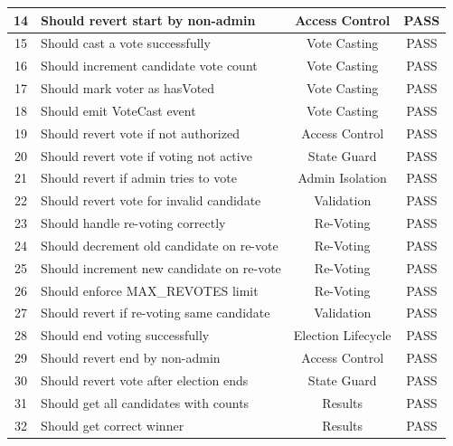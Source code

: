 \documentclass[oneside,a4paper,12pt]{book}
\begin{document}
\begin{longtable}{|c|p{8.5cm}|c|c|}
\hline
14 & Should revert start by non-admin & Access Control & \textcolor{green!60!black}{PASS} \\
\hline
15 & Should cast a vote successfully & Vote Casting & \textcolor{green!60!black}{PASS} \\
\hline
16 & Should increment candidate vote count & Vote Casting & \textcolor{green!60!black}{PASS} \\
\hline
17 & Should mark voter as hasVoted & Vote Casting & \textcolor{green!60!black}{PASS} \\
\hline
18 & Should emit VoteCast event & Vote Casting & \textcolor{green!60!black}{PASS} \\
\hline
19 & Should revert vote if not authorized & Access Control & \textcolor{green!60!black}{PASS} \\
\hline
20 & Should revert vote if voting not active & State Guard & \textcolor{green!60!black}{PASS} \\
\hline
21 & Should revert if admin tries to vote & Admin Isolation & \textcolor{green!60!black}{PASS} \\
\hline
22 & Should revert vote for invalid candidate & Validation & \textcolor{green!60!black}{PASS} \\
\hline
23 & Should handle re-voting correctly & Re-Voting & \textcolor{green!60!black}{PASS} \\
\hline
24 & Should decrement old candidate on re-vote & Re-Voting & \textcolor{green!60!black}{PASS} \\
\hline
25 & Should increment new candidate on re-vote & Re-Voting & \textcolor{green!60!black}{PASS} \\
\hline
26 & Should enforce MAX\_REVOTES limit & Re-Voting & \textcolor{green!60!black}{PASS} \\
\hline
27 & Should revert if re-voting same candidate & Validation & \textcolor{green!60!black}{PASS} \\
\hline
28 & Should end voting successfully & Election Lifecycle & \textcolor{green!60!black}{PASS} \\
\hline
29 & Should revert end by non-admin & Access Control & \textcolor{green!60!black}{PASS} \\
\hline
30 & Should revert vote after election ends & State Guard & \textcolor{green!60!black}{PASS} \\
\hline
31 & Should get all candidates with counts & Results & \textcolor{green!60!black}{PASS} \\
\hline
32 & Should get correct winner & Results & \textcolor{green!60!black}{PASS} \\

\end{longtable}
\end{document}
